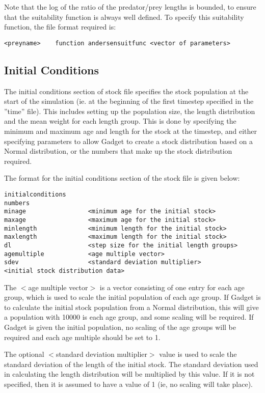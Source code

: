 \documentclass [a4paper, 10pt]{book}
\begin{document}
\bigskip
Note that the log of the ratio of the predator/prey lengths is bounded, to ensure that the suitability function is always well defined.  To specify this suitability function, the file format required is:

\begin{verbatim}
<preyname>    function andersensuitfunc <vector of parameters>
\end{verbatim}

\subsection{Initial Conditions}\label{subsec:stockinitial}
The initial conditions section of stock file specifies the stock population at the start of the simulation (ie. at the beginning of the first timestep specified in the ''time'' file).  This includes setting up the population size, the length distribution and the mean weight for each length group.  This is done by specifying the minimum and maximum age and length for the stock at the timestep, and either specifying parameters to allow Gadget to create a stock distribution based on a Normal distribution, or the numbers that make up the stock distribution required.

\bigskip
The format for the initial conditions section of the stock file is given below:

\begin{verbatim}
initialconditions
numbers
minage                 <minimum age for the initial stock>
maxage                 <maximum age for the initial stock>
minlength              <minimum length for the initial stock>
maxlength              <maximum length for the initial stock>
dl                     <step size for the initial length groups>
agemultiple            <age multiple vector>
sdev                   <standard deviation multiplier>
<initial stock distribution data>
\end{verbatim}

The $<$age multiple vector$>$ is a vector consisting of one entry for each age group, which is used to scale the initial population of each age group.  If Gadget is to calculate the initial stock population from a Normal distribution, this will give a population with 10000 is each age group, and some scaling will be required.  If Gadget is given the initial population, no scaling of the age groups will be required and each age multiple should be set to 1.

\bigskip
The optional $<$standard deviation multiplier$>$ value is used to scale the standard deviation of the length of the initial stock.  The standard deviation used in calculating the length distribution will be multiplied by this value.  If it is not specified, then it is assumed to have a value of 1 (ie, no scaling will take place).
\end{document}
